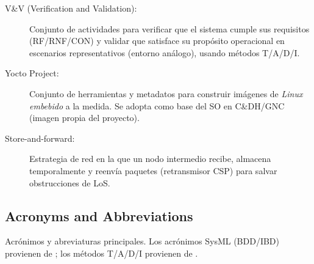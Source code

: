 \begin{description}
    \item[V\&V (Verification and Validation):] Conjunto de actividades para verificar que el sistema cumple sus requisitos (RF/RNF/CON) y validar que satisface su propósito operacional en escenarios representativos (entorno análogo), usando métodos T/A/D/I. \cite{ieee_29148}
    \item[Yocto Project:] Conjunto de herramientas y metadatos para construir imágenes de \emph{Linux embebido} a la medida. Se adopta como base del SO en C\&DH/GNC (imagen propia del proyecto).
    \item[Store-and-forward:] Estrategia de red en la que un nodo intermedio recibe, almacena temporalmente y reenvía paquetes (retransmisor CSP) para salvar obstrucciones de LoS.
\end{description}

\subsection{Acronyms and Abbreviations}

Acrónimos y abreviaturas principales. Los acrónimos SysML (BDD/IBD) provienen de \cite{omg_sysml_mbse}; los métodos T/A/D/I provienen de \cite{ieee_29148}.

